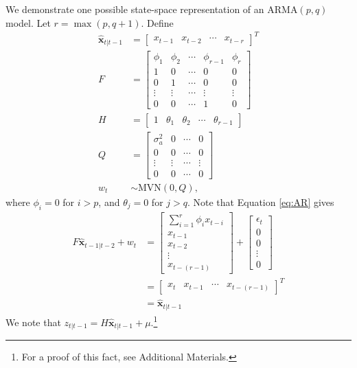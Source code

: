 We demonstrate one possible state-space representation of an $\text{ARMA}(p,q)$ model. Let
$r = \max(p, q+1)$. Define
\begin{align}
    \hat{\textbf{x}}_{t|t-1}&=\begin{bmatrix}x_{t-1}&x_{t-2}&\dotsb&x_{t-r}\end{bmatrix}^T\\
    F &= \begin{bmatrix}
        \phi_1 & \phi_2 & \cdots & \phi_{r-1} & \phi_r\\
        1 & 0 & \cdots & 0 & 0\\
        0 & 1 & \cdots & 0 & 0\\
        \vdots & \vdots & \cdots & \vdots & \vdots\\
        0 & 0 & \cdots & 1 & 0
    \end{bmatrix}\\
    H &= \begin{bmatrix}
        1 & \theta_1 & \theta_2 & \cdots & \theta_{r-1}
    \end{bmatrix}\\
    Q &= \begin{bmatrix}
        \sigma_a^2 & 0 & \cdots & 0\\
        0 & 0 & \cdots & 0\\
        \vdots & \vdots & \cdots & \vdots\\
        0 & 0 & \cdots & 0
    \end{bmatrix}\\
    w_t &\sim \text{MVN}(0, Q),
    \label{eqn:error}
\end{align}
where $\phi_i = 0$ for $i>p$, and $\theta_j = 0$ for $j > q$.
Note that Equation \ref{eq:AR} gives
\begin{align}
    F\hat{\textbf{x}}_{t-1|t-2}+w_{t}&=\begin{bmatrix}\sum_{i=1}^r\phi_ix_{t-i}\\
                                x_{t-1}\\
                                x_{t-2}\\
                                \vdots\\
                                x_{t-(r-1)}
                  \end{bmatrix}+\begin{bmatrix}\epsilon_t\\0\\0\\\vdots\\0\end{bmatrix}\\
                &=\begin{bmatrix}x_t&x_{t-1}&\cdots&x_{t-(r-1)}\end{bmatrix}^T\\
                &=\hat{\textbf{x}}_{t|t-1}
\end{align}
We note that $z_{t|t-1}=H\hat{\textbf{x}}_{t|t-1}+\mu$.\footnote{
For a proof of this fact, see Additional Materials.}

